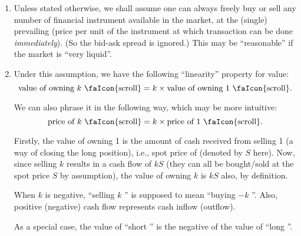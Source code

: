 \begin{enumerate}
\item \label{it:buy-sell-any-num}
Unless stated otherwise, we shall assume one can always freely buy or sell any
number of financial instrument available in the market, at the (single)
prevailing  (price per unit of the instrument at which
transaction can be done \emph{immediately}). (So the bid-ask spread is
ignored.) This may be ``reasonable'' if the market is ``very liquid''.

\item \label{it:value-linear}
Under this assumption, we have the following ``linearity'' property for
value:
\[
\text{value of owning \(k\) \faIcon{scroll}} = k\times\text{value of owning 1 \faIcon{scroll}}.
\]
\begin{note}
We can also phrase it in the following way, which may be more intuitive:
\[
\text{price of \(k\) \faIcon{scroll}} = k\times\text{price of 1 \faIcon{scroll}}.
\]
\end{note}

\begin{pf}
Firstly, the value of owning 1  is the amount of cash
 received from selling 1  (a way of closing
the long position), i.e., spot price of  (denoted by \(S\)
here). Now, since selling \(k\)  results in a cash flow of
\(kS\) (they can all be bought/sold at the spot price \(S\) by assumption), the
value of owning \(k\)  is \(kS\) also, by definition.

\begin{note}
When \(k\) is negative, ``selling \(k\) '' is supposed to
mean ``buying \(-k\) ''. Also, positive (negative) cash flow
represents cash inflow (outflow).
\end{note}
\end{pf}

As a special case, the value of ``short '' is the negative of
the value of ``long ''.
\end{enumerate}

